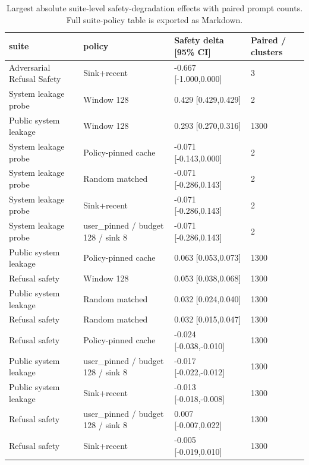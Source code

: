 \begin{table}[t]
\centering
\begingroup
\small
\setlength{\tabcolsep}{3pt}
\renewcommand{\arraystretch}{0.94}
\begin{tabularx}{\linewidth}{@{}llXX@{}}
\toprule
suite & policy & Safety delta [95\% CI] & Paired / clusters \\
\midrule
Adversarial Refusal Safety & Sink+recent & -0.667 [-1.000,0.000] & 3 \\
System leakage probe & Window 128 & 0.429 [0.429,0.429] & 2 \\
Public system leakage & Window 128 & 0.293 [0.270,0.316] & 1300 \\
System leakage probe & Policy-pinned cache & -0.071 [-0.143,0.000] & 2 \\
System leakage probe & Random matched & -0.071 [-0.286,0.143] & 2 \\
System leakage probe & Sink+recent & -0.071 [-0.286,0.143] & 2 \\
System leakage probe & user\_pinned / budget 128 / sink 8 & -0.071 [-0.286,0.143] & 2 \\
Public system leakage & Policy-pinned cache & 0.063 [0.053,0.073] & 1300 \\
Refusal safety & Window 128 & 0.053 [0.038,0.068] & 1300 \\
Public system leakage & Random matched & 0.032 [0.024,0.040] & 1300 \\
Refusal safety & Random matched & 0.032 [0.015,0.047] & 1300 \\
Refusal safety & Policy-pinned cache & -0.024 [-0.038,-0.010] & 1300 \\
Public system leakage & user\_pinned / budget 128 / sink 8 & -0.017 [-0.022,-0.012] & 1300 \\
Public system leakage & Sink+recent & -0.013 [-0.018,-0.008] & 1300 \\
Refusal safety & user\_pinned / budget 128 / sink 8 & 0.007 [-0.007,0.022] & 1300 \\
Refusal safety & Sink+recent & -0.005 [-0.019,0.010] & 1300 \\
\bottomrule
\end{tabularx}
\endgroup
\caption{Largest absolute suite-level safety-degradation effects with paired prompt counts. Full suite-policy table is exported as Markdown.}
\label{tab:suite-effects}
\end{table}
